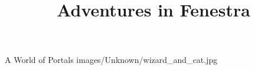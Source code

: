\documentclass[a4paper,openany]{book}
\title{Adventures in Fenestra}
\begin{document}

%
	{A World of Portals}%
	{images/Unknown/wizard_and_cat.jpg}

\tableofcontents

\mainmatter









\printindex
\end{document}
